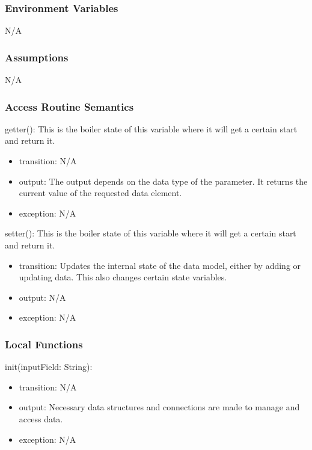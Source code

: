 \documentclass[12pt, titlepage]{article}
\begin{document}
\subsubsection{Environment Variables}

N/A

\subsubsection{Assumptions}

N/A

\subsubsection{Access Routine Semantics}

\noindent getter(): This is the boiler state of this variable where it will get a certain start and return it.
\begin{itemize}
    \item transition: N/A
    \item output: The output depends on the data type of the parameter. It returns the current value of the requested data element.
    \item exception: N/A
\end{itemize}

\noindent setter(): This is the boiler state of this variable where it will get a certain start and return it.
\begin{itemize}
    \item transition: Updates the internal state of the data model, either by adding or updating data. This also changes certain state variables.
    \item output: N/A
    \item exception: N/A
\end{itemize}

\subsubsection{Local Functions}

\noindent init(inputField: String):
\begin{itemize}
\item transition: N/A
\item output: Necessary data structures and connections are made to manage and access data.
\item exception: N/A
\end{itemize}
\end{document}
